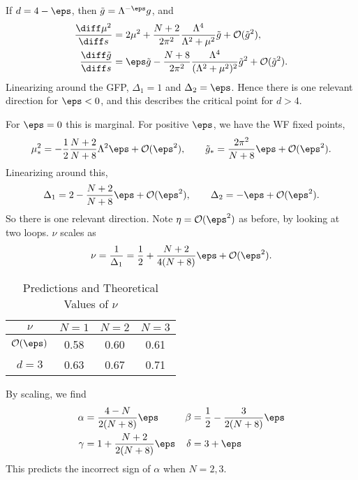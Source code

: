 \documentclass[12pt]{article}
\begin{document}
If $d = 4 - \eps$, then $\tilde g = \Lambda^{-\eps} g$, and
\begin{align*}
	\frac{\diff \mu^2}{\diff s} &= 2 \mu^2 + \frac{N + 2}{2 \pi^2} \frac{\Lambda^{4}}{\Lambda^2 + \mu^2} \tilde g + \mathcal{O}(\tilde g^2), \\
	\frac{\diff \tilde g}{\diff s} &= \eps \tilde g - \frac{N+8}{2 \pi^2} \frac{\Lambda^{4}}{(\Lambda^2 + \mu^2)^2} \tilde g^2 + \mathcal{O}(\tilde g^2).
\end{align*}
Linearizing around the GFP, $\Delta_1 = 1$ and $\Delta_2 = \eps$. Hence there is one relevant direction for $\eps < 0$, and this describes the critical point for $d > 4$.

For $\eps = 0$ this is marginal. For positive $\eps$, we have the WF fixed points,
\[
\mu_\ast^2 = - \frac 12 \frac{N+2}{N+8} \Lambda^2 \eps + \mathcal{O}(\eps ^2), \qquad \tilde g_\ast = \frac{2 \pi^2}{N+8}\eps + \mathcal{O}(\eps^2).
\]
Linearizing around this,
\[
\Delta_1 = 2 - \frac{N+2}{N+8}\eps + \mathcal{O}(\eps^2), \qquad \Delta_2 = - \eps + \mathcal{O}(\eps^2).
\]
So there is one relevant direction. Note $\eta = \mathcal{O}(\eps^2)$ as before, by looking at two loops. $\nu$ scales as
\[
\nu = \frac{1}{\Delta_1} = \frac 12 + \frac{N+2}{4(N+8)}\eps + \mathcal{O}(\eps^2).
\]
\begin{table}[ht]
\centering
\begin{tabular}{c|ccc}
	$\nu$ & $N=1$ & $N=2$ & $N=3$ \\
	\hline
	$\mathcal{O}(\eps)$ & 0.58 & 0.60 & 0.61 \\
	$d = 3$ & 0.63 & 0.67 & 0.71
\end{tabular}
\caption{Predictions and Theoretical Values of $\nu$}
\end{table}
By scaling, we find
\begin{align*}
	\alpha &= \frac{4 - N}{2(N + 8)}\eps & \beta &= \frac 12 - \frac{3}{2(N+8)}\eps \\
	\gamma &= 1 + \frac{N+2}{2(N+8)}\eps & \delta &= 3 + \eps
\end{align*}
This predicts the incorrect sign of $\alpha$ when $N = 2, 3$.

\newpage

\printindex
\end{document}
